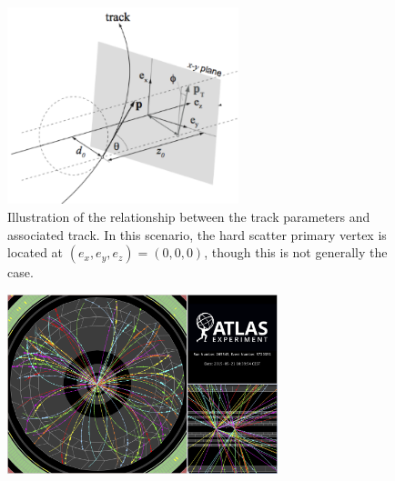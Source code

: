 \begin{figure}[!htb]
    \begin{center}
        \includegraphics[width=0.6\textwidth]{figures/chapter3/perigee_params}
        \caption{
            Illustration of the relationship between the track parameters and associated track.
            In this scenario, the hard scatter primary vertex is located
            at $(e_x, e_y, e_z) = (0,0,0)$, though this is not generally the case.
        }
        \label{fig:track_params}
    \end{center}
\end{figure}

\begin{figure}[!htb]
    \begin{center}
        \includegraphics[width=0.7\textwidth]{figures/chapter3/event_display_tracking_vertexing}
        \caption{
        }
        \label{fig:id_event_display}
    \end{center}
\end{figure}
\FloatBarrier
